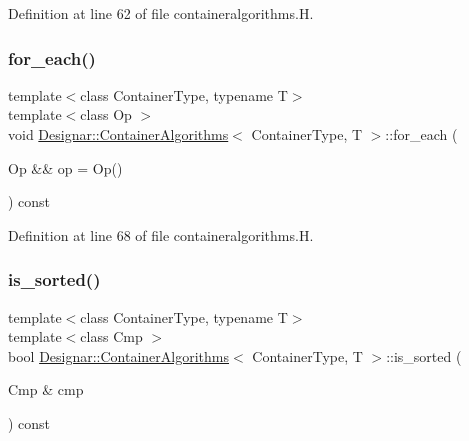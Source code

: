 Definition at line 62 of file containeralgorithms.\+H.

\mbox{\label{class_designar_1_1_container_algorithms_a5fc63764f264b91fd45fd275ecc0f27a}} 
\subsubsection{\texorpdfstring{for\+\_\+each()}{for\_each()}\hspace{0.1cm}{\footnotesize\ttfamily [2/2]}}
{\footnotesize\ttfamily template$<$class Container\+Type, typename T$>$ \\
template$<$class Op $>$ \\
void \hyperlink{class_designar_1_1_container_algorithms}{Designar\+::\+Container\+Algorithms}$<$ Container\+Type, T $>$\+::for\+\_\+each (\begin{DoxyParamCaption}\item[{Op \&\&}]{op = {\ttfamily Op()} }\end{DoxyParamCaption}) const\hspace{0.3cm}{\ttfamily [inline]}}



Definition at line 68 of file containeralgorithms.\+H.

\mbox{\label{class_designar_1_1_container_algorithms_a7cbb0be554a1f4bad257b2d171be9bec}} 
\subsubsection{\texorpdfstring{is\+\_\+sorted()}{is\_sorted()}\hspace{0.1cm}{\footnotesize\ttfamily [1/2]}}
{\footnotesize\ttfamily template$<$class Container\+Type, typename T$>$ \\
template$<$class Cmp $>$ \\
bool \hyperlink{class_designar_1_1_container_algorithms}{Designar\+::\+Container\+Algorithms}$<$ Container\+Type, T $>$\+::is\+\_\+sorted (\begin{DoxyParamCaption}\item[{Cmp \&}]{cmp }\end{DoxyParamCaption}) const\hspace{0.3cm}{\ttfamily [inline]}}




